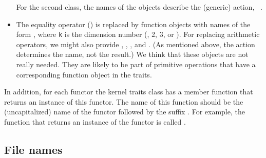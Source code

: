 \begin{itemize}
      For the second class, the names of the objects describe the (generic)
      action, \eg~.
\item The equality operator () is replaced by function
      objects with names of the form , where {\tt k} is
      the dimension number (\ie, 2, 3, or ).
      For replacing arithmetic operators, we might also provide ,
      , , and . (As mentioned
      above, the action determines the name, not the result.) We think
      that these objects are not really needed.  They are likely to be
      part of primitive operations that have a corresponding function
      object in the traits.
\end{itemize}

In addition, for each functor the kernel traits class has a member
function that returns an instance of this functor.  The name of this
function should be the (uncapitalized) name of the
functor followed by the suffix .%
For example, the function that returns an instance of the
 functor is called .

\subsection*{File names}

